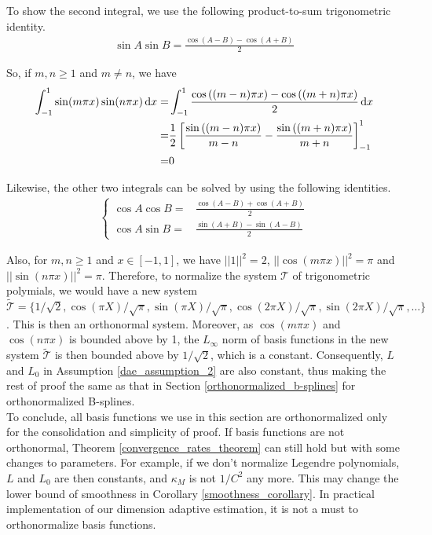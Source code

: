         To show the second integral, we use the following product-to-sum trigonometric identity.
        \begin{align*}
            \sin A \sin B=\frac{\cos(A-B)-\cos(A+B)}{2}
        \end{align*}

        So, if $m,n\ge 1$ and $m \not=n$, we have
        \begin{align*}
            \int_{-1}^1 \sin(m\pi x)\sin(n\pi x)\mathop{}\!\mathrm{d} x =& \int_{-1}^1 \frac{\cos\left((m-n)\pi x\right)-\cos\left((m+n)\pi x\right)}{2}\mathop{}\!\mathrm{d} x\\
            =& \frac{1}{2}\left[\frac{\sin\left((m-n)\pi x\right)}{m-n}-\frac{\sin\left((m+n)\pi x\right)}{m+n}\right]_{-1}^1\\
            =&0
        \end{align*}

        Likewise, the other two integrals can be solved by using the following identities.
        \begin{align*}
        \begin{cases}
            \cos A \cos B=&\frac{\cos(A-B)+\cos(A+B)}{2}\\
            \cos A \sin B=&\frac{\sin(A+B)-\sin(A-B)}{2}
        \end{cases}
        \end{align*}

        Also, for $m,n\ge1$ and $x \in [-1,1]$, we have $||1||^2=2$, $||\cos(m\pi x)||^2=\pi$ and $||\sin(n\pi x)||^2=\pi$. Therefore, to normalize the system $\mathcal{T}$ of trigonometric polymials, we would have a new system $\tilde{\mathcal{T}}=\{1/\sqrt{2}, \cos(\pi X)/\sqrt{\pi}, \sin(\pi X)/\sqrt{\pi}, \cos(2\pi X)/\sqrt{\pi}, \sin(2\pi X)/\sqrt{\pi},\ldots\}$. This is then an orthonormal system. Moreover, as $\cos(m\pi x)$ and $\cos(n\pi x)$ is bounded above by 1, the $L_{\infty}$ norm of basis functions in the new system $\tilde{\mathcal{T}}$ is then bounded above by $1/\sqrt{2}$, which is a constant. Consequently, $L$ and $L_0$ in Assumption \ref{dae_assumption_2} are also constant, thus making the rest of proof the same as that in Section \ref{orthonormalized_b-splines} for orthonormalized B-splines.\\

        To conclude, all basis functions we use in this section are orthonormalized only for the consolidation and simplicity of proof. If basis functions are not orthonormal, Theorem \ref{convergence_rates_theorem} can still hold but with some changes to parameters. For example, if we don't normalize Legendre polynomials, $L$ and $L_0$ are then constants, and $\kappa_M$ is not $1/C^2$ any more. This may change the lower bound of smoothness in Corollary \ref{smoothness_corollary}. In practical implementation of our dimension adaptive estimation, it is not a must to orthonormalize basis functions.


